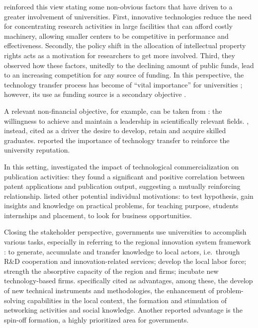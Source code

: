 \citet{Baldini2007} reinforced this view stating some non-obvious factors that have driven to a greater involvement of universities. First, innovative technologies reduce the need for concentrating research activities in large facilities that can afford costly machinery, allowing smaller centers to be competitive in performance and effectiveness. Secondly, the policy shift in the allocation of intellectual property rights acts as a motivation for researchers to get more involved. Third, they observed how these factors, unitedly to the declining amount of public funds, lead to an increasing competition for any source of funding. In this perspective, the technology transfer process has become of \enquote{vital importance} for universities \citep{Muscio2008}; however, its use as funding source is a secondary objective \citep{Jensen1998}.

A relevant non-financial objective, for example, can be taken from \citet{Tijssen2006}: the willingness to achieve and maintain a leadership in scientifically relevant fields. \citet{Leitch2005}, instead, cited as a driver the desire to develop, retain and acquire skilled graduates. \citet{Baldini2006} reported the importance of technology transfer to reinforce the university reputation. 

In this setting, \citet{Wong2010} investigated the impact of technological commercialization on publication activities: they found a significant and positive correlation between patent applications and publication output, suggesting a mutually reinforcing relationship. \citet{Lee2000} listed other potential individual motivations: to test hypothesis, gain insights and knowledge on practical problems, for teaching purpose, students internships and placement, to look for business opportunities. 

Closing the stakeholder perspective, governments use universities to accomplish various tasks, especially in referring to the regional innovation system framework \citep{Fritsch2007,Balderi2007}: to generate, accumulate and transfer knowledge to local actors, i.e.\ through R\&D cooperation and innovation-related services; develop the local labor force; strength the absorptive capacity of the region and firms; incubate new technology-based firms. \citet{AzagraCaro2010} specifically cited as advantages, among these, the develop of new technical instruments and methodologies, the enhancement of problem-solving capabilities in the local context, the formation and stimulation of networking activities and social knowledge. Another reported advantage is the spin-off formation, a highly prioritized area for governments.

